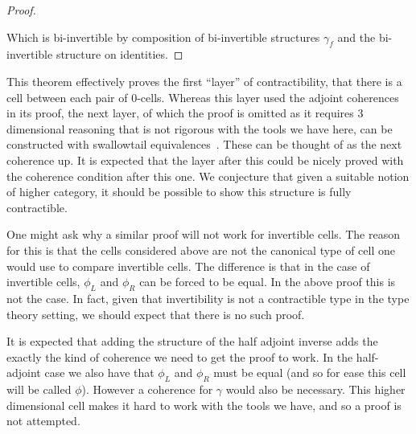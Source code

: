 \documentclass[draft]{article}
\begin{document}
\begin{proof}
\begin{center}
  \end{center}

  Which is bi-invertible by composition of bi-invertible structures
  \(\gamma_f\) and the bi-invertible structure on identities.
\end{proof}

This theorem effectively proves the first ``layer'' of
contractibility, that there is a cell between each pair of
\(0\)-cells. Whereas this layer used the adjoint coherences in its
proof, the next layer, of which the proof is omitted as it requires 3
dimensional reasoning that is not rigorous with the tools we have
here, can be constructed with swallowtail
equivalences~\cite{nlab:lax_2-adjunction}. These can be thought of as
the next coherence up. It is expected that the layer after this could
be nicely proved with the coherence condition after this one. We
conjecture that given a suitable notion of higher category, it should
be possible to show this structure is fully contractible.

One might ask why a similar proof will not work for invertible cells.
The reason for this is that the cells considered above are not the
canonical type of cell one would use to compare invertible cells. The
difference is that in the case of invertible cells, \(\phi_L\) and
\(\phi_R\) can be forced to be equal. In the above proof this is not
the case. In fact, given that invertibility is not a contractible type
in the type theory setting, we should expect that there is no such
proof.

It is expected that adding the structure of the half adjoint inverse
adds the exactly the kind of coherence we need to get the proof to
work. In the half-adjoint case we also have that \(\phi_L\) and
\(\phi_R\) must be equal (and so for ease this cell will be called
\(\phi\)). However a coherence for \(\gamma\) would also be necessary.
This higher dimensional cell makes it hard to work with the tools we
have, and so a proof is not attempted.
\end{document}
